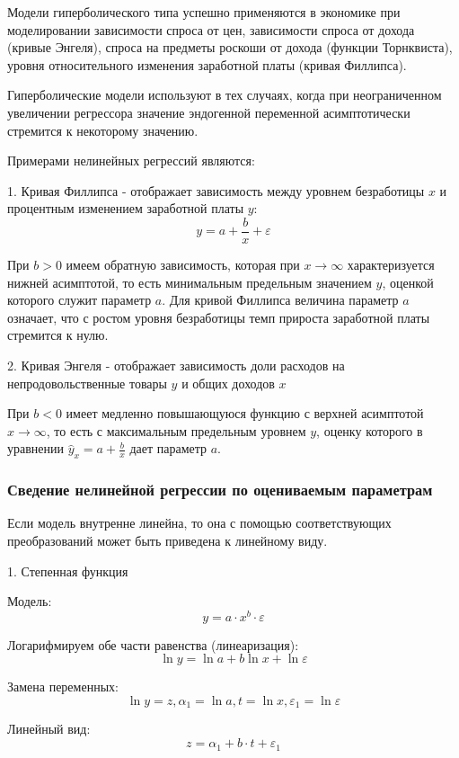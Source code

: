 \documentclass[aps,%
12pt,%
final,%
oneside,
onecolumn,%
musixtex, %
superscriptaddress,%
centertags]{article} %
\theoremstyle{plain}
\theoremstyle{definition}
\theoremstyle{remark}
\begin{document}
Модели гиперболического типа успешно применяются в экономике при моделировании зависимости спроса от цен, зависимости спроса от дохода (кривые Энгеля), спроса на предметы роскоши от дохода (функции Торнквиста), уровня относительного изменения заработной платы (кривая Филлипса).

Гиперболические модели используют в тех случаях, когда при неограниченном увеличении регрессора значение эндогенной переменной асимптотически стремится к некоторому значению.

Примерами нелинейных регрессий являются:

1. Кривая Филлипса - отображает зависимость между уровнем безработицы $x$ и процентным изменением заработной платы $y$:
$$y = a + \frac{b}{x} + \varepsilon$$

При $b>0$ имеем обратную зависимость, которая при $x \to \infty$ характеризуется нижней асимптотой, то есть минимальным предельным значением $y$, оценкой которого служит параметр $a$. Для кривой Филлипса величина параметр $a$ означает, что с ростом уровня безработицы темп прироста заработной платы стремится к нулю. 

2. Кривая Энгеля - отображает зависимость доли расходов на непродовольственные товары $y$ и общих доходов $x$

При $b<0$ имеет медленно повышающуюся функцию с верхней асимптотой $x \to \infty$, то есть с максимальным предельным уровнем $y$, оценку которого в уравнении $\hat{y}_x = a + \frac{b}{x}$ дает параметр $a$.

\subsubsection{Сведение нелинейной регрессии по оцениваемым параметрам}

Если модель внутренне линейна, то она с помощью соответствующих преобразований может быть приведена к линейному виду.

\begin{center} 1. Степенная функция \end{center}

Модель:
$$ y = a \cdot x^b \cdot \varepsilon $$

Логарифмируем обе части равенства (линеаризация):
$$ \ln y =\ln a + b\ln x + \ln \varepsilon $$

Замена переменных:
$$ \ln y = z, \alpha_1 = \ln a, t = \ln x, \varepsilon_1 = \ln \varepsilon $$

Линейный вид:
$$ z =\alpha_1 + b \cdot t + \varepsilon_1 $$
\end{document}
